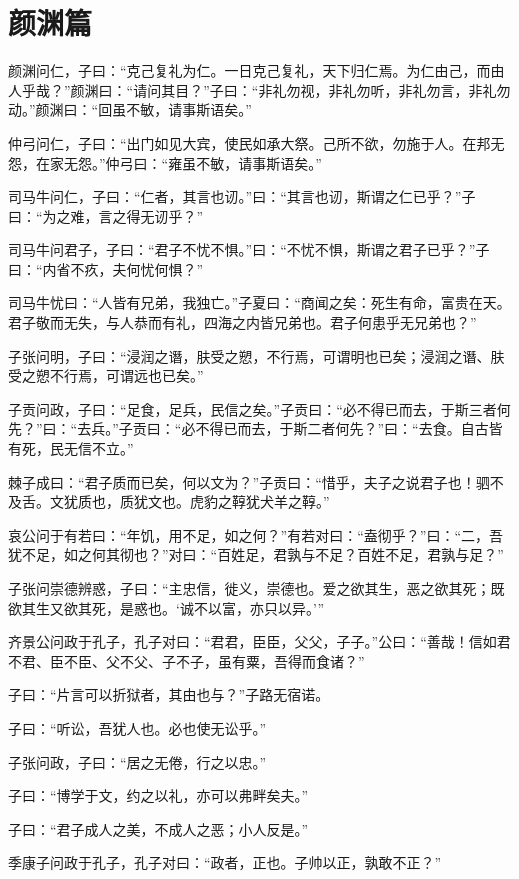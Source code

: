 \documentclass[12pt,a4paper]{ctexbook}
\begin{document}
\section{颜渊篇}
颜渊问仁，子曰：“克己复礼为仁。一日克己复礼，天下归仁焉。为仁由己，而由人乎哉？”颜渊曰：“请问其目？”子曰：“非礼勿视，非礼勿听，非礼勿言，非礼勿动。”颜渊曰：“回虽不敏，请事斯语矣。”\par
仲弓问仁，子曰：“出门如见大宾，使民如承大祭。己所不欲，勿施于人。在邦无怨，在家无怨。”仲弓曰：“雍虽不敏，请事斯语矣。”\par
司马牛问仁，子曰：“仁者，其言也讱。”曰：“其言也讱，斯谓之仁已乎？”子曰：“为之难，言之得无讱乎？”\par
司马牛问君子，子曰：“君子不忧不惧。”曰：“不忧不惧，斯谓之君子已乎？”子曰：“内省不疚，夫何忧何惧？”\par
司马牛忧曰：“人皆有兄弟，我独亡。”子夏曰：“商闻之矣：死生有命，富贵在天。君子敬而无失，与人恭而有礼，四海之内皆兄弟也。君子何患乎无兄弟也？”\par
子张问明，子曰：“浸润之谮，肤受之愬，不行焉，可谓明也已矣；浸润之谮、肤受之愬不行焉，可谓远也已矣。”\par
子贡问政，子曰：“足食，足兵，民信之矣。”子贡曰：“必不得已而去，于斯三者何先？”曰：“去兵。”子贡曰：“必不得已而去，于斯二者何先？”曰：“去食。自古皆有死，民无信不立。”\par
棘子成曰：“君子质而已矣，何以文为？”子贡曰：“惜乎，夫子之说君子也！驷不及舌。文犹质也，质犹文也。虎豹之鞟犹犬羊之鞟。”\par
哀公问于有若曰：“年饥，用不足，如之何？”有若对曰：“盍彻乎？”曰：“二，吾犹不足，如之何其彻也？”对曰：“百姓足，君孰与不足？百姓不足，君孰与足？”\par
子张问崇德辨惑，子曰：“主忠信，徙义，崇德也。爱之欲其生，恶之欲其死；既欲其生又欲其死，是惑也。‘诚不以富，亦只以异。’”\par
齐景公问政于孔子，孔子对曰：“君君，臣臣，父父，子子。”公曰：“善哉！信如君不君、臣不臣、父不父、子不子，虽有粟，吾得而食诸？”\par
子曰：“片言可以折狱者，其由也与？”子路无宿诺。\par
子曰：“听讼，吾犹人也。必也使无讼乎。”\par
子张问政，子曰：“居之无倦，行之以忠。”\par
子曰：“博学于文，约之以礼，亦可以弗畔矣夫。”\par
子曰：“君子成人之美，不成人之恶；小人反是。”\par
季康子问政于孔子，孔子对曰：“政者，正也。子帅以正，孰敢不正？”\par
\end{document}
